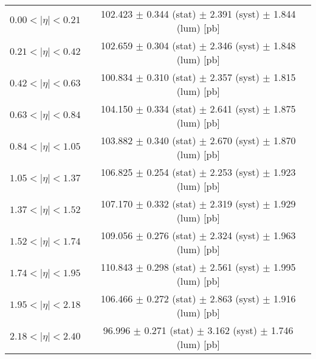 \begin{tabular}{lc}
\hline
$0.00 < |\eta| <0.21$          & 102.423 $\pm$ 0.344 (stat) $\pm$ 2.391 (syst) $\pm$ 1.844 (lum) [pb]  \\
$0.21 < |\eta| <0.42$          & 102.659 $\pm$ 0.304 (stat) $\pm$ 2.346 (syst) $\pm$ 1.848 (lum) [pb]  \\
$0.42 < |\eta| <0.63$          & 100.834 $\pm$ 0.310 (stat) $\pm$ 2.357 (syst) $\pm$ 1.815 (lum) [pb]  \\
$0.63 < |\eta| <0.84$          & 104.150 $\pm$ 0.334 (stat) $\pm$ 2.641 (syst) $\pm$ 1.875 (lum) [pb]  \\
$0.84 < |\eta| <1.05$          & 103.882 $\pm$ 0.340 (stat) $\pm$ 2.670 (syst) $\pm$ 1.870 (lum) [pb]  \\
$1.05 < |\eta| <1.37$          & 106.825 $\pm$ 0.254 (stat) $\pm$ 2.253 (syst) $\pm$ 1.923 (lum) [pb]  \\
$1.37 < |\eta| <1.52$          & 107.170 $\pm$ 0.332 (stat) $\pm$ 2.319 (syst) $\pm$ 1.929 (lum) [pb]  \\
$1.52 < |\eta| <1.74$          & 109.056 $\pm$ 0.276 (stat) $\pm$ 2.324 (syst) $\pm$ 1.963 (lum) [pb]  \\
$1.74 < |\eta| <1.95$          & 110.843 $\pm$ 0.298 (stat) $\pm$ 2.561 (syst) $\pm$ 1.995 (lum) [pb]  \\
$1.95 < |\eta| <2.18$          & 106.466 $\pm$ 0.272 (stat) $\pm$ 2.863 (syst) $\pm$ 1.916 (lum) [pb]  \\
$2.18 < |\eta| <2.40$          & 96.996 $\pm$ 0.271 (stat) $\pm$ 3.162 (syst) $\pm$ 1.746 (lum) [pb]  \\
\hline
\end{tabular}
